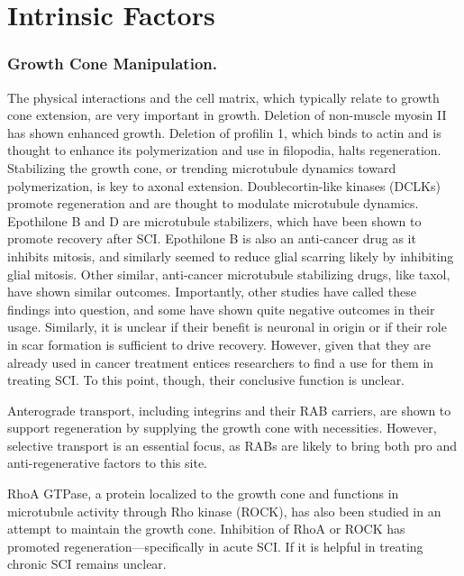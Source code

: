 \documentclass[12pt]{report}
\begin{document}
\section{Intrinsic Factors}

\subsubsection{Growth Cone Manipulation.}

The physical interactions and the cell matrix, which typically relate to growth cone extension, are very important in growth. Deletion of non-muscle myosin II has shown enhanced growth. Deletion of profilin 1, which binds to actin and is thought to enhance its polymerization and use in filopodia, halts regeneration. Stabilizing the growth cone, or trending microtubule dynamics toward polymerization, is key to axonal extension. Doublecortin-like kinases (DCLKs) promote regeneration and are thought to modulate microtubule dynamics. Epothilone B and D are microtubule stabilizers, which have been shown to promote recovery after SCI. Epothilone B is also an anti-cancer drug as it inhibits mitosis, and similarly seemed to reduce glial scarring likely by inhibiting glial mitosis. Other similar, anti-cancer microtubule stabilizing drugs, like taxol, have shown similar outcomes. Importantly, other studies have called these findings into question, and some have shown quite negative outcomes in their usage. Similarly, it is unclear if their benefit is neuronal in origin or if their role in scar formation is sufficient to drive recovery. However, given that they are already used in cancer treatment entices researchers to find a use for them in treating SCI. To this point, though, their conclusive function is unclear.\newline

Anterograde transport, including integrins and their RAB carriers, are shown to support regeneration by supplying the growth cone with necessities. However, selective transport is an essential focus, as RABs are likely to bring both pro and anti-regenerative factors to this site.\newline

RhoA GTPase, a protein localized to the growth cone and functions in microtubule activity through Rho kinase (ROCK), has also been studied in an attempt to maintain the growth cone. Inhibition of RhoA or ROCK has promoted regeneration---specifically in acute SCI. If it is helpful in treating chronic SCI remains unclear.
\end{document}
